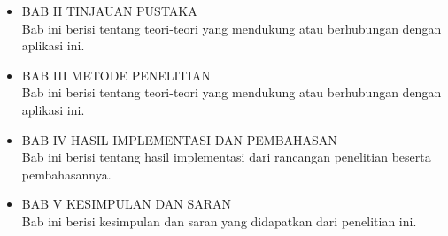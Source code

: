 \begin{flushleft}
\begin{justify}
\begin{itemize}
        \item BAB II TINJAUAN PUSTAKA
        \\
          Bab ini berisi tentang teori-teori yang mendukung atau berhubungan dengan aplikasi ini.
        \item BAB III METODE PENELITIAN
        \\
          Bab ini berisi tentang teori-teori yang mendukung atau berhubungan dengan aplikasi ini.
        \item BAB IV HASIL IMPLEMENTASI DAN PEMBAHASAN
        \\
          Bab ini berisi tentang hasil implementasi dari rancangan penelitian beserta pembahasannya.
        \item BAB V KESIMPULAN DAN SARAN
        \\
          Bab ini berisi kesimpulan dan saran yang didapatkan dari penelitian ini.
        \\
      \end{itemize}

  \end{justify}

\end{flushleft}



\newpage